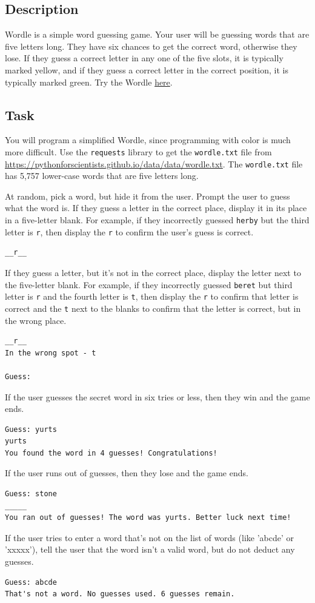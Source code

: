 \subsection*{Description}
Wordle is a simple word guessing game. Your user will be guessing words that are five letters long. They have six chances to get the correct word, otherwise they lose. If they guess a correct letter in any one of the five slots, it is typically marked yellow, and if they guess a correct letter in the correct position, it is typically marked green. Try the Wordle \href{https://www.nytimes.com/games/wordle/index.html}{here}.
\subsection*{Task}
You will program a simplified Wordle, since programming with color is much more difficult. Use the \verb|requests| library to get the \verb|wordle.txt| file from \\\href{https://pythonforscientists.github.io/data/data/wordle.txt}{https://pythonforscientists.github.io/data/data/wordle.txt}. The \verb|wordle.txt| file has 5,757 lower-case words that are five letters long.\par
At random, pick a word, but hide it from the user. Prompt the user to guess what the word is. If they guess a letter in the correct place, display it in its place in a five-letter blank. For example, if they incorrectly guessed \verb|herby| but the third letter is \verb|r|, then display the \verb|r| to confirm the user's guess is correct.
\begin{lstlisting}[style=none]
__r__
\end{lstlisting}
If they guess a letter, but it's not in the correct place, display the letter next to the five-letter blank. For example, if they incorrectly guessed \verb|beret| but third letter is \verb|r| and the fourth letter is \verb|t|, then display the \verb|r| to confirm that letter is correct and the \verb|t| next to the blanks to confirm that the letter is correct, but in the wrong place.
\begin{lstlisting}[style=none]
__r__
In the wrong spot - t

Guess: 
\end{lstlisting}
If the user guesses the secret word in six tries or less, then they win and the game ends.
\begin{lstlisting}[style=none]
Guess: yurts
yurts
You found the word in 4 guesses! Congratulations!
\end{lstlisting}
If the user runs out of guesses, then they lose and the game ends. 
\begin{lstlisting}[style=none]
Guess: stone
_____
You ran out of guesses! The word was yurts. Better luck next time!
\end{lstlisting}
If the user tries to enter a word that's not on the list of words (like 'abcde' or 'xxxxx'), tell the user that the word isn't a valid word, but do not deduct any guesses.
\begin{lstlisting}
Guess: abcde
That's not a word. No guesses used. 6 guesses remain.
\end{lstlisting}
